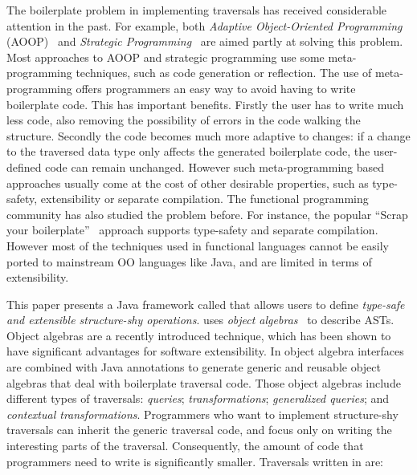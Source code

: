 The boilerplate problem in implementing traversals has
received considerable attention in the past. For example, both
\emph{Adaptive Object-Oriented Programming} (AOOP)~\cite{DemeterBook}
and \emph{Strategic
  Programming}~\cite{borovansky1996elan,visser1998core}
are aimed partly at solving this problem. Most approaches to AOOP and
strategic programming use some meta-programming techniques, such as
code generation or reflection. The use of meta-programming offers
programmers an easy way to avoid having to write boilerplate code.
This has important benefits. Firstly the user has
to write much less code, also removing the possibility of errors in
the code walking the structure. Secondly the code becomes much more
adaptive to changes: if a change to the traversed data type  only affects the generated boilerplate code,  the user-defined code
can remain unchanged.  However such
meta-programming based approaches  usually come at the cost of
other desirable properties, such as type-safety, extensibility or
separate compilation. The functional programming community has also
studied the problem before. For instance,  the popular
``Scrap your boilerplate''~\cite{ralf03syb} approach supports type-safety and separate
compilation.  However most of the techniques used in functional
languages cannot be easily ported to mainstream OO languages like Java, and are
limited in terms of extensibility.

This paper presents a Java framework called \name that allows users to
define \emph{type-safe and extensible structure-shy operations}. \name uses
\emph{object algebras}~\cite{bruno12oa} to describe ASTs. Object
algebras are a recently introduced technique, which has been shown to
have significant advantages for software extensibility.  In \name
object algebra interfaces are combined with Java annotations to
generate generic and reusable object algebras that deal with
boilerplate traversal code.  Those object algebras include different
types of traversals: \emph{queries}; \emph{transformations};
\emph{generalized queries}; and \emph{contextual transformations}. Programmers
who want to implement structure-shy traversals can inherit the
generic traversal code, and focus only on writing the interesting
parts of the traversal. Consequently, the amount of code that
programmers need to write is significantly smaller.
Traversals
written in \name are:

